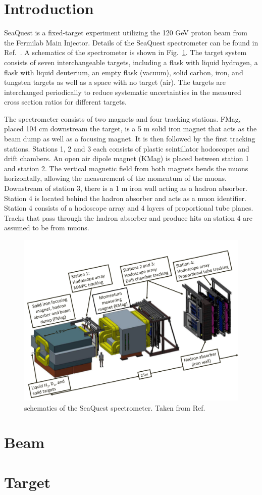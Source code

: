 \section{Introduction}
SeaQuest is a fixed-target experiment utilizing the 120 GeV proton beam from 
the Fermilab Main Injector. Details of the SeaQuest spectrometer can be found 
in Ref.\ \cite{aidala2019}. A schematics of the spectrometer is shown in Fig.\ 
\ref{fig:spectrometer}. The target system consists of seven interchangeable 
targets, including a flask with liquid hydrogen, a flask with liquid deuterium,
an empty flask (vacuum), solid carbon, iron, and tungsten targets as well as a 
space with no target (air). The targets are interchanged periodically to reduce 
systematic uncertainties in the measured cross section ratios for different 
targets.

The spectrometer consists of two magnets and four tracking stations. FMag, 
placed 104 cm downstream the target, is a 5 m solid iron magnet that acts as 
the beam dump as well as a focusing magnet. It is then followed by the first 
tracking stations. Stations 1, 2 and 3 each consists of plastic scintillator 
hodoscopes and drift chambers. An open air dipole magnet (KMag) is placed 
between station 1 and station 2. The vertical magnetic field from both magnets 
bends the muons horizontally, allowing the measurement of the momentum of the 
muons. Downstream of station 3, there is a 1 m iron wall acting as a hadron 
absorber. Station 4 is located behind the hadron absorber and acts as a muon 
identifier. Station 4 consists of a hodoscope array and 4 layers of 
proportional tube planes. Tracks that pass through the hadron absorber and 
produce hits on station 4 are assumed to be from muons. 

\begin{figure}[htbp!]
    \centering
    \includegraphics[width=0.6\linewidth]{./images/SeaQuestSpectrometer}
    \caption{schematics of the SeaQuest spectrometer. Taken from Ref.\ 
		\cite{aidala2019}}
    \label{fig:spectrometer}
\end{figure}


\section{Beam}

\section{Target}

